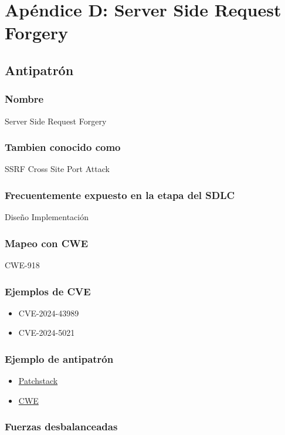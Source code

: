 \chapter{Apéndice D: Server Side Request Forgery}
\section{Antipatrón}
\subsection{Nombre}
Server Side Request Forgery
\subsection{Tambien conocido como}
SSRF
Cross Site Port Attack
\subsection{Frecuentemente expuesto en la etapa del SDLC}
Diseño
Implementación
\subsection{Mapeo con CWE}
CWE-918
\subsection{Ejemplos de CVE}
\begin{itemize}
    \item CVE-2024-43989
    \item CVE-2024-5021
\end{itemize}
\subsection{Ejemplo de antipatrón}

\begin{itemize}
    \item \href{https://patchstack.com/academy/wordpress/vulnerabilities/server-side-request-forgery/}{Patchstack}
    \item \href{https://cwe.mitre.org/data/definitions/918.html}{CWE}
\end{itemize}

\subsection{Fuerzas desbalanceadas}

